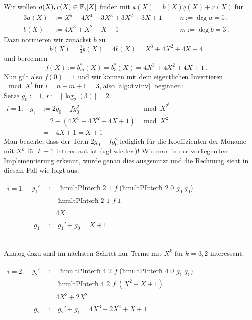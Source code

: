\begin{beispiel}
  Wir wollen $q(X),r(X)\in \mathbb{F}_5[X]$ finden mit
  $a(X) = b(X) q(X) + r(X)$ für 
  \begin{alignat*}{3}
    a(X) &:= X^5 + 4X^4 + 3 X^3 + 3 X^2 + 3 X + 1 &&\quad n:= \deg a = 5\,,\\
    b(X) &:= 4 X^3 + X^2 + X + 1 &&\quad m := \deg b = 3\,.
  \end{alignat*}
  Dazu normieren wir zunächst $b$ zu 
  \[ \bar b(X) = \tfrac{1}{4} b(X) = 4 b(X) = X^3 + 4 X^2 +4X +4\]
  und berechnen 
  \[ f(X) := b^\ast_m(X) = b^\ast_3(X) = 4X^3 + 4X^2 + 4X + 1\,.\]
  Nun gilt also $f(0) = 1$ und wir können mit dem eigentlichen Invertieren
  $\mod X^l$ für $ l = n-m+1 = 3$, also \autoref{alg:divInv}, beginnen:\\
  Setze $g_0 := 1$, $r := \lceil \log_2(3)\rceil = 2$.\\
  $\begin{array}{lrll}
    i=1: & g_1 & := 2g_0 - fg_0^2 & \bmod X^{2^i}\\
              && = 2 - (4X^3+4X^2+4X+1) &\bmod X^2 \\
              && = -4X +1 = X+1
  \end{array}$\\
  Man beachte, dass der Term $2g_0 - fg_0^2$ lediglich für die Koeffizienten
  der Monome mit $X^k$ für $k=1$ interessant ist (vgl wieder 
  )! Wie man in der vorliegenden Implementierung erkennt,
  wurde genau dies ausgenutzt und die Rechnung sieht in diesem Fall wie folgt
  aus:\\
  \begin{tabular}{lrll}
    $i=1:$ & $g_1'$&$:=$ ħmultPInterħ $2$ $1$ $f$ (ħmultPInterħ $2$ $0$ $g_0$ $g_0$)\\
            &&$=$ ħmultPInterħ $2$ $1$ $f$ $1$\\
            &&$= 4X$\\
        & $g_1$&$:= g_1' + g_0 = X+1$
  \end{tabular}\\
  Analog dazu sind im nächsten Schritt nur Terme mit $X^k$ für 
  $k=3,2$ interessant:\\
  \begin{tabular}{lrll}
    $i=2:$ & $g_2'$&$:=$ ħmultPInterħ $4$ $2$ $f$ (ħmultPInterħ $4$ $0$ $g_1$ $g_1$)\\
            &&$=$ ħmultPInterħ $4$ $2$ $f$ $(X^2+X+1)$\\
            &&$= 4X^3+2X^2$\\
        & $g_2$&$:= g_2' + g_1 = 4X^3+2X^2+X+1$

\end{tabular}
\end{beispiel}
